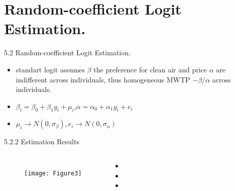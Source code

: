 \documentclass[10pt]{beamer}
\begin{document}
\section{Random-coefficient Logit Estimation.}

\begin{frame}[fragile]{5.2 Random-coefficient Logit Estimation.}
      \begin{itemize}
          \item     standart logit assumes $\beta$ the preference for clean air and price $\alpha$ are indifferent across individuals, thus homogeneous MWTP $-\beta/\alpha$ across individuals.
          \item $\beta_i = \beta_0+\beta_1 y_i +\mu_i$,$\alpha = \alpha_0 +\alpha_{1}y_i+e_i$
          \item $\mu_i\rightarrow N(0,\sigma_\beta),e_i\rightarrow N(0,\sigma_\alpha)$
      \end{itemize}
\end{frame}


\begin{frame}{5.2.2 Estimation Results}
    \begin{columns}[c] 
    \column{9cm}
    \begin{figure}
        \centering
        \texttt{[image: Figure3]}
    \end{figure}
    \column{4cm}
    \begin{itemize}
        \item 
        \item 
        \item 
    \end{itemize}
	\end{columns}
\end{frame}
\end{document}
